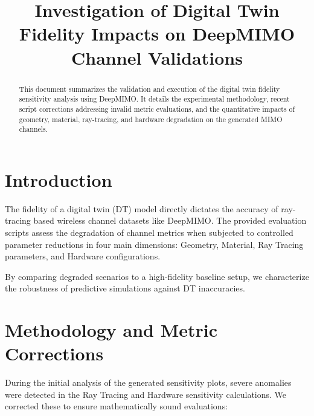 \documentclass[conference]{IEEEtran}
\begin{document}
\title{Investigation of Digital Twin Fidelity Impacts on DeepMIMO Channel Validations}

\author{
}

\maketitle

\begin{abstract}
This document summarizes the validation and execution of the digital twin fidelity sensitivity analysis using DeepMIMO. It details the experimental methodology, recent script corrections addressing invalid metric evaluations, and the quantitative impacts of geometry, material, ray-tracing, and hardware degradation on the generated MIMO channels.
\end{abstract}

\section{Introduction}
The fidelity of a digital twin (DT) model directly dictates the accuracy of ray-tracing based wireless channel datasets like DeepMIMO. The provided evaluation scripts assess the degradation of channel metrics when subjected to controlled parameter reductions in four main dimensions: Geometry, Material, Ray Tracing parameters, and Hardware configurations.

By comparing degraded scenarios to a high-fidelity baseline setup, we characterize the robustness of predictive simulations against DT inaccuracies.

\section{Methodology and Metric Corrections}
During the initial analysis of the generated sensitivity plots, severe anomalies were detected in the Ray Tracing and Hardware sensitivity calculations. We corrected these to ensure mathematically sound evaluations:
\end{document}
